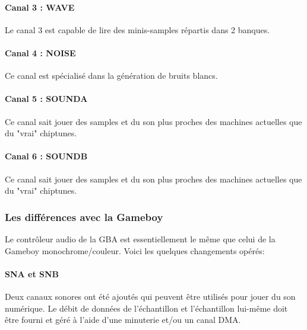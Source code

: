 \documentclass[12pt,a4paper]{article}
\begin{document}

    \paragraph{Canal 3 : WAVE} Le canal 3 est capable de lire des minis-samples répartis dans 2 banques.


    \paragraph{Canal 4 : NOISE} Ce canal est spécialisé dans la génération de bruits blancs.


    \paragraph{Canal 5 : SOUNDA} Ce canal sait jouer des samples et du son plus proches des machines actuelles que du "vrai" chiptunes.

    \paragraph{Canal 6 : SOUNDB} Ce canal sait jouer des samples et du son plus proches des machines actuelles que du "vrai" chiptunes.


    \subsubsection{Les différences avec la Gameboy}

    Le contrôleur audio de la GBA est essentiellement le même que celui de la Gameboy monochrome/couleur.
    Voici les quelques changements opérés:

    \paragraph{SNA et SNB} Deux canaux sonores ont été ajoutés qui peuvent être utilisés pour jouer du son numérique.
                            Le débit de données de l'échantillon et l'échantillon lui-même doit être fourni et géré à l'aide d'une minuterie et/ou un canal DMA.
\end{document}
